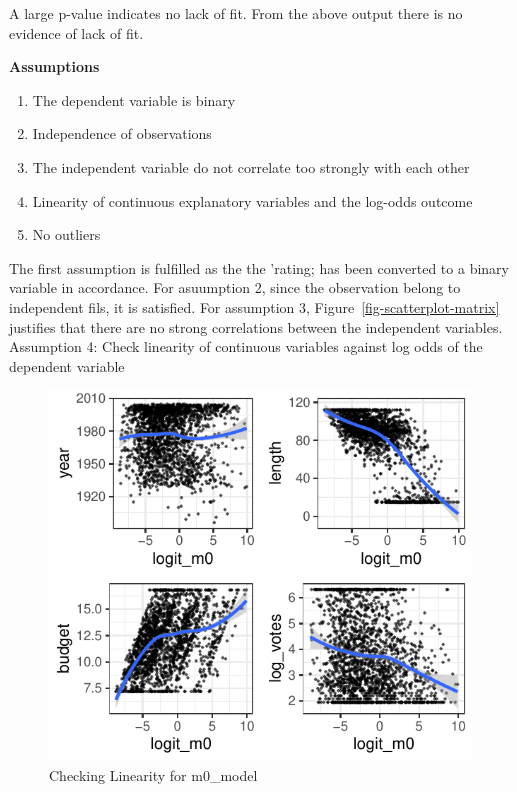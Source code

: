 \documentclass[
  letterpaper,
  DIV=11,
  numbers=noendperiod]{scrartcl}
\begin{document}
A large p-value indicates no lack of fit. From the above output there is
no evidence of lack of fit.

\textbf{Assumptions}

\begin{enumerate}
\def\labelenumi{\arabic{enumi}.}
\item
  The dependent variable is binary
\item
  Independence of observations
\item
  The independent variable do not correlate too strongly with each other
\item
  Linearity of continuous explanatory variables and the log-odds outcome
\item
  No outliers
\end{enumerate}

The first assumption is fulfilled as the the 'rating; has been converted
to a binary variable in accordance. For asuumption 2, since the
observation belong to independent fils, it is satisfied. For assumption
3, Figure~\ref{fig-scatterplot-matrix} justifies that there are no
strong correlations between the independent variables.
\clearpage Assumption 4: Check linearity of continuous variables against
log odds of the dependent variable

\begin{figure}

{\centering \includegraphics{Group_06_Analysis_files/figure-pdf/fig-lin-m0-1.pdf}

}

\caption{\label{fig-lin-m0}Checking Linearity for m0\_model}

\end{figure}
\end{document}
